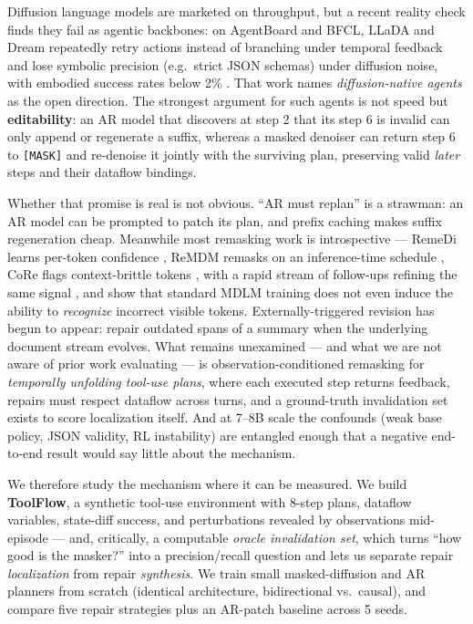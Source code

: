 \documentclass{article}
\begin{document}
Diffusion language models are marketed on throughput, but a recent reality check finds they fail as
agentic backbones: on AgentBoard and BFCL, LLaDA and Dream repeatedly retry actions instead of
branching under temporal feedback and lose symbolic precision (e.g.\ strict JSON schemas) under
diffusion noise, with embodied success rates below 2\% \citep{bitterlesson2026,llada2025,dream2025}.
That work names \emph{diffusion-native agents} as the open direction. The strongest argument for such
agents is not speed but \textbf{editability}: an AR model that discovers at step 2 that its step 6 is
invalid can only append or regenerate a suffix, whereas a masked denoiser can return step 6 to
\texttt{[MASK]} and re-denoise it jointly with the surviving plan, preserving valid \emph{later}
steps and their dataflow bindings.

Whether that promise is real is not obvious. ``AR must replan'' is a strawman: an AR model can be
prompted to patch its plan, and prefix caching makes suffix regeneration cheap. Meanwhile most remasking work is
introspective --- RemeDi learns per-token confidence \citep{remedi2025}, ReMDM remasks on an
inference-time schedule \citep{remdm2025}, CoRe flags context-brittle tokens \citep{core2026}, with a
rapid stream of follow-ups refining the same signal
\citep{t2m2026,revise2026,selfcorrect2026,hong2025unmask}, and \citet{cdlm2025} show that standard
MDLM training does not even induce the ability to \emph{recognize} incorrect visible tokens.
Externally-triggered revision has begun to appear: \citet{zou2026detect} repair outdated spans of a
summary when the underlying document stream evolves. What remains unexamined --- and what we are not
aware of prior work evaluating --- is observation-conditioned remasking for \emph{temporally
unfolding tool-use plans}, where each executed step returns feedback, repairs must respect dataflow
across turns, and a ground-truth invalidation set exists to score localization itself. And at 7--8B
scale the confounds (weak base policy, JSON validity, RL instability) are entangled enough that a
negative end-to-end result would say little about the mechanism.

We therefore study the mechanism where it can be measured. We build \textbf{ToolFlow}, a synthetic
tool-use environment with 8-step plans, dataflow variables, state-diff success, and perturbations
revealed by observations mid-episode --- and, critically, a computable \emph{oracle invalidation
set}, which turns ``how good is the masker?'' into a precision/recall question and lets us separate
repair \emph{localization} from repair \emph{synthesis}. We train small masked-diffusion and AR
planners from scratch (identical architecture, bidirectional vs.\ causal), and compare five repair
strategies plus an AR-patch baseline across 5 seeds.
\end{document}
